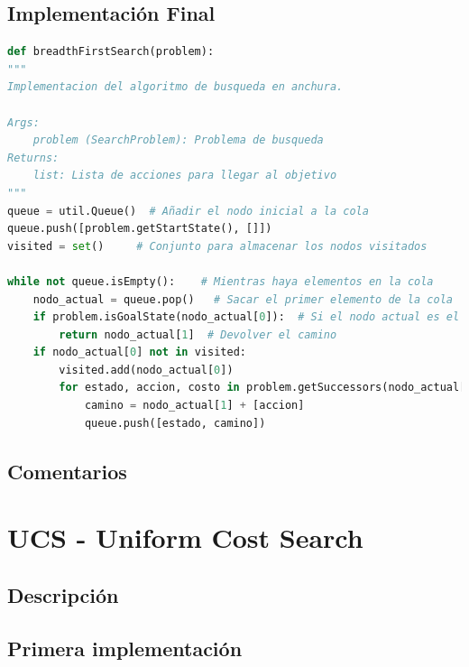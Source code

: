 \documentclass{report}
\begin{document}
        \subsection*{Implementación Final}
          \begin{lstlisting}[language=Python, caption=Implementación final del BFS]
def breadthFirstSearch(problem):
"""
Implementacion del algoritmo de busqueda en anchura.

Args:
    problem (SearchProblem): Problema de busqueda
Returns:
    list: Lista de acciones para llegar al objetivo
"""
queue = util.Queue()  # Añadir el nodo inicial a la cola
queue.push([problem.getStartState(), []])
visited = set()     # Conjunto para almacenar los nodos visitados

while not queue.isEmpty():    # Mientras haya elementos en la cola
    nodo_actual = queue.pop()   # Sacar el primer elemento de la cola
    if problem.isGoalState(nodo_actual[0]):  # Si el nodo actual es el objetivo
        return nodo_actual[1]  # Devolver el camino
    if nodo_actual[0] not in visited:
        visited.add(nodo_actual[0])
        for estado, accion, costo in problem.getSuccessors(nodo_actual[0]): # Añadir los hijos del nodo actual a la cola
            camino = nodo_actual[1] + [accion]
            queue.push([estado, camino])
          \end{lstlisting}
        \subsection*{Comentarios}
      \clearpage\section{UCS - Uniform Cost Search}
        \subsection*{Descripción}
          \paragraph*{}{

          }
        \subsection*{Primera implementación}
          \paragraph*{}{

          }
\end{document}
